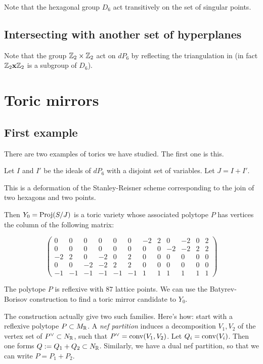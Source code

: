 \documentclass[11pt, english]{article}
\begin{document}
Note that the hexagonal group $D_6$ act transitively on the set of singular points.

\subsection{Intersecting with another set of hyperplanes}

Note that the group $\mathbb{Z}_2 \times \mathbb{Z}_2$ act on $dP_6$ by reflecting the triangulation in  (in fact $\mathbb{Z}_2 \mathbf{x} \mathbb{Z}_2$ is a subgroup of $D_6$).

\section{Toric mirrors}

\subsection{First example}

There are two examples of torics we have studied. The first one is this.

Let $I$ and $I'$ be the ideals of $dP_6$ with a disjoint set of variables. Let $J=I+I'$.

\begin{remark}
This is a deformation of the Stanley-Reisner scheme corresponding to the join of two hexagons and two points.
\end{remark}

Then $Y_0 = \operatorname{Proj}(S/J)$ is a toric variety whose associated polytope $P$ has vertices the column of the following matrix:

\begin{equation}
\left(
\begin{array}{rrrrrrrrrrrr}
0 & 0 & 0 & 0 & 0 & 0 & -2 & 2 & 0 & -2 & 0 & 2 \\
0 & 0 & 0 & 0 & 0 & 0 & 0 & 0 & -2 & -2 & 2 & 2 \\
-2 & 2 & 0 & -2 & 0 & 2 & 0 & 0 & 0 & 0 & 0 & 0 \\
0 & 0 & -2 & -2 & 2 & 2 & 0 & 0 & 0 & 0 & 0 & 0 \\
-1 & -1 & -1 & -1 & -1 & -1 & 1 & 1 & 1 & 1 & 1 & 1
\end{array}
\right)
\end{equation}

The polytope $P$ is reflexive with $87$ lattice points. We can use the Batyrev-Borisov construction to find a toric mirror candidate to $Y_0$.

The construction actually give two such families. Here's how: start with a reflexive polytope $P \subset M_{\mathbb{R}}$. A \emph{nef partition} induces a decomposition $V_1,V_2$ of the vertex set of $P^\vee \subset N_{\mathbb{R}}$, such that $P^\vee = \operatorname{conv}(V_1,V_2)$. Let $Q_i = \operatorname{conv}(V_i)$. Then one forms $Q := Q_1+Q_2 \subset N_{\mathbb{R}}$. Similarly, we have a dual nef partition, so that we can write $P = P_1 + P_2$.
\end{document}
